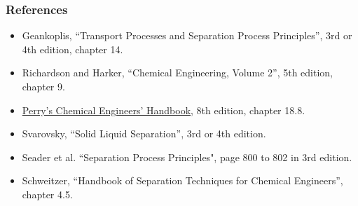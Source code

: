 \begin{frame}\frametitle{References}
	\begin{itemize}
		\item	Geankoplis, ``Transport Processes and Separation Process Principles'', 3rd or 4th edition, chapter 14.
		\item	Richardson and Harker, ``Chemical Engineering, Volume 2'', 5th edition, chapter 9.
		\item	\href{http://accessengineeringlibrary.com/browse/perrys-chemical-engineers-handbook-eighth-edition}{Perry's Chemical Engineers' Handbook}, 8th edition, chapter 18.8.
		\item	Svarovsky, ``Solid Liquid Separation'', 3rd or 4th edition. %
		\item	Seader et al. ``Separation Process Principles", page 800 to 802 in 3rd edition.
		\item	Schweitzer, ``Handbook of Separation Techniques for Chemical Engineers'', chapter 4.5.
	\end{itemize}
\end{frame}
